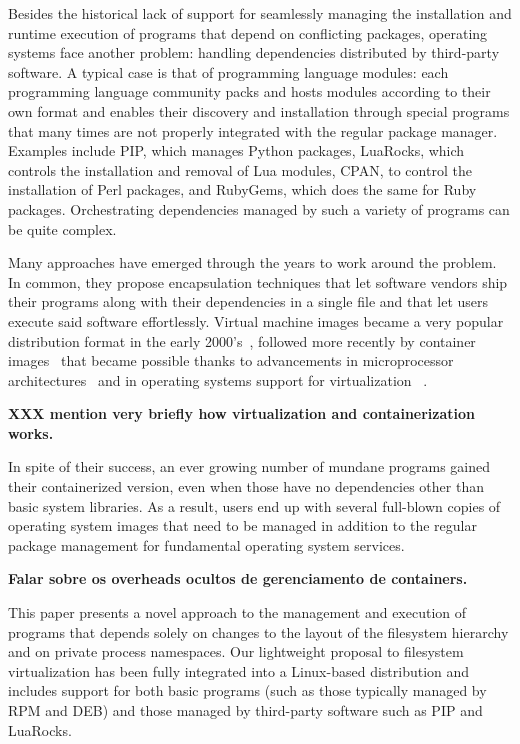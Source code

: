 \documentclass[sigplan, anonymous, 10pt]{acmart}
\begin{document}
Besides the historical lack of support for seamlessly managing the installation and runtime
execution of programs that depend on conflicting packages, operating systems face another problem:
handling dependencies distributed by third-party software. A typical case is that of programming
language modules: each programming language community packs and hosts modules according to their own
format and enables their discovery and installation through special programs that many times are not
properly integrated with the regular package manager. Examples include PIP, which manages Python
packages, LuaRocks, which controls the installation and removal of Lua modules, CPAN, to control the
installation of Perl packages, and RubyGems, which does the same for Ruby packages. Orchestrating
dependencies managed by such a variety of programs can be quite complex.

Many approaches have emerged through the years to work around the problem. In common, they propose
encapsulation techniques that let software vendors ship their programs along with their dependencies
in a single file and that let users execute said software effortlessly. Virtual machine images
became a very popular distribution format in the early 2000's~\cite{smith2005:vm}, followed more recently by
container images~\cite{fink2014:docker} that became possible thanks to advancements in microprocessor
architectures~\cite{uhlig2005:vtx, amd2005:svm} and in operating systems support for virtualization
~\cite{russell2008:virtio, dall2014:kvm+arm, kivity2007:kvm}. 

\textbf{XXX mention very briefly how virtualization and containerization works.}
\lipsum[1]

In spite of their success, an ever growing number of mundane programs gained their containerized version,
even when those have no dependencies other than basic system libraries. As a result, users end up
with several full-blown copies of operating system images that need to be managed in addition to
the regular package management for fundamental operating system services.

\textbf{Falar sobre os overheads ocultos de gerenciamento de containers.}

This paper presents a novel approach to the management and execution of programs that depends
solely on changes to the layout of the filesystem hierarchy and on private process namespaces.
Our lightweight proposal to filesystem virtualization has been fully integrated into a Linux-based
distribution and includes support for both basic programs (such as those typically managed by RPM
and DEB) and those managed by third-party software such as PIP and LuaRocks.
\end{document}
